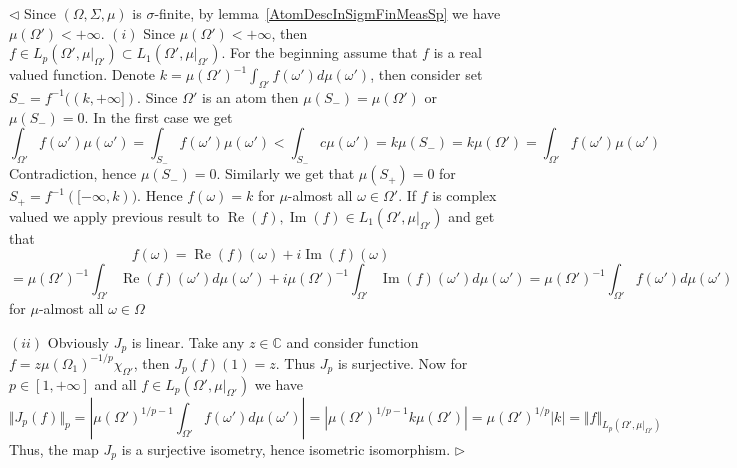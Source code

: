 \documentclass[12pt]{article}
\newenvironment{proof}{\par $\triangleleft$}{$\triangleright$}
\begin{document}
\begin{proof}
    Since $(\Omega,\Sigma,\mu)$ is $\sigma$-finite, by
    lemma~\ref{AtomDescInSigmFinMeasSp} we have $\mu(\Omega')<+\infty$.
    $(i)$ Since $\mu(\Omega')<+\infty$, then $f\in
        L_p(\Omega',\mu|_{\Omega'})\subset L_1(\Omega',\mu|_{\Omega'})$. For the
    beginning assume that $f$ is a real valued function. Denote
    $k={\mu(\Omega')}^{-1}\int_{\Omega'} f(\omega')d\mu(\omega')$, then consider
    set $S_-=f^{-1}((k,+\infty])$. Since $\Omega'$ is an atom then  %
    $\mu(S_-)=\mu(\Omega')$ or $\mu(S_-)=0$. In the first case we get
    $$
        \int_{\Omega'} f(\omega')\mu(\omega')
        =\int_{S_-} f(\omega')\mu(\omega')
        <\int_{S_-} c\mu(\omega')
        =k\mu(S_-)
        =k\mu(\Omega')
        =\int_{\Omega'} f(\omega')\mu(\omega')
    $$
    Contradiction, hence $\mu(S_-)=0$. Similarly we get that $\mu(S_+)=0$ for
    $S_+=f^{-1}([-\infty,k))$. Hence $f(\omega)=k$ for $\mu$-almost  %
    all $\omega\in\Omega'$. If $f$ is complex valued we apply previous result to
    $\operatorname{Re}(f),\operatorname{Im}(f)\in L_1(\Omega',\mu|_{\Omega'})$
    and get that
    $$
        f(\omega)
        =\operatorname{Re}(f)(\omega)+i\operatorname{Im}(f)(\omega)
    $$
    $$
        ={\mu(\Omega')}^{-1}\int_{\Omega'}
        \operatorname{Re}(f)(\omega')d\mu(\omega')
        +i{\mu(\Omega')}^{-1}\int_{\Omega'}
        \operatorname{Im}(f)(\omega')d\mu(\omega')
        ={\mu(\Omega')}^{-1}\int_{\Omega'} f(\omega')d\mu(\omega')
    $$
    for $\mu$-almost all $\omega\in\Omega$

    $(ii)$ Obviously $J_p$ is linear. Take any $z\in\mathbb{C}$ and consider
    function $f=z{\mu(\Omega_1)}^{-1/p}\chi_{\Omega'}$, then $J_p(f)(1)=z$. Thus
    $J_p$ is surjective. Now for $p\in[1,+\infty]$ and all $f\in
        L_p(\Omega',\mu|_{\Omega'})$ we have
    $$
        \Vert J_p(f)\Vert_p
        =\left|
            {\mu(\Omega')}^{1/p-1}\int_{\Omega'}f(\omega')d\mu(\omega')
        \right|
        =\left|{\mu(\Omega')}^{1/p-1}k\mu(\Omega')\right|
        ={\mu(\Omega')}^{1/p}|k|
        =\Vert f\Vert_{L_p(\Omega',\mu|_{\Omega'})}
    $$
    Thus, the map $J_p$ is a surjective isometry, hence isometric isomorphism.
\end{proof}
\end{document}
